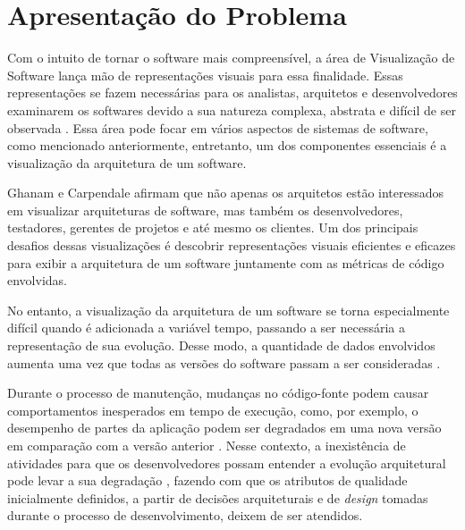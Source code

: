 \section{Apresentação do Problema} \label{sec:apresentacao-do-problema}

Com o intuito de tornar o software mais compreensível, a área de Visualização de Software lança mão de representações visuais para essa finalidade. Essas representações se fazem necessárias para os analistas, arquitetos e desenvolvedores examinarem os softwares devido a sua natureza complexa, abstrata e difícil de ser observada \cite{Petre2006}. Essa área pode focar em vários aspectos de sistemas de software, como mencionado anteriormente, entretanto, um dos componentes essenciais é a visualização da arquitetura de um software.

Ghanam e Carpendale \cite{Ghanam2008} afirmam que não apenas os arquitetos estão interessados em visualizar arquiteturas de software, mas também os desenvolvedores, testadores, gerentes de projetos e até mesmo os clientes. Um dos principais desafios dessas visualizações é descobrir representações visuais eficientes e eficazes para exibir a arquitetura de um software juntamente com as métricas de código envolvidas.

No entanto, a visualização da arquitetura de um software se torna especialmente difícil quando é adicionada a variável tempo, passando a ser necessária a representação de sua evolução. Desse modo, a quantidade de dados envolvidos aumenta uma vez que todas as versões do software passam a ser consideradas \cite{Caserta2011}\cite{Khan2012}.

Durante o processo de manutenção, mudanças no código-fonte podem causar comportamentos inesperados em tempo de execução, como, por exemplo, o desempenho de partes da aplicação podem ser degradados em uma nova versão em comparação com a versão anterior \cite{SandovalAlcocer2013}. Nesse contexto, a inexistência de atividades para que os desenvolvedores possam entender a evolução arquitetural pode levar a sua degradação \cite{DAmbros2009}, fazendo com que os atributos de qualidade inicialmente definidos, a partir de decisões arquiteturais e de \textit{design} tomadas durante o processo de desenvolvimento, deixem de ser atendidos.


